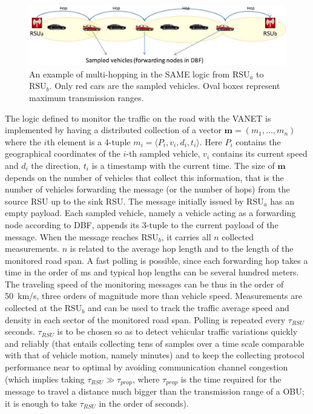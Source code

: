 \documentclass[conference]{IEEEtran}
\begin{document}
\begin{figure}[tbhp]
\begin{center}
\includegraphics[width=1.8\columnwidth]{fig/SAME_HOP.eps}
\caption{An example of multi-hopping in the SAME logic from $\text{RSU}_a$ to $\text{RSU}_b$. Only red cars are the sampled vehicles. Oval boxes represent maximum transmission ranges.}
\label{fig:same_hop}
\end{center}
\end{figure}



The logic defined to monitor the traffic on the road with the VANET is implemented by having a distributed collection of a vector $\mathbf m = (m_1,\ldots,m_n)$ where the $i$th element is a 4-tuple $m_i=\langle P_i, v_i, d_i, t_i \rangle$. Here $P_i$ contains the geographical coordinates of the $i$-th sampled vehicle, $v_i$ contains its current speed and $d_i$ the direction,  $t_i$ is a timestamp with the current time. The size of $\mathbf m$ depends on the number of vehicles that collect this information, that is the number of vehicles forwarding the message (or the number of hops) from the source RSU up to the sink RSU. The message initially issued by $\text{RSU}_a$ has an empty payload. Each sampled vehicle, namely a vehicle acting as a forwarding node according to DBF, appends its 3-tuple to the current payload of the message. When the message reaches $\text{RSU}_b$, it carries all $n$ collected measurements. $n$ is related to the average hop length and to the length of the monitored road span. A fast polling is possible, since each forwarding hop takes a time in the order of ms and typical hop lengths can be several hundred meters. The traveling speed of the monitoring messages can be thus in the order of 50~km/s, three orders of magnitude more than vehicle speed. Measurements are collected at the $\text{RSU}_b$ and can be used to track the traffic average speed and density in each sector of the monitored road span. Polling is repeated every $\tau_{RSU}$ seconds. $\tau_{RSU}$ is to be chosen so as to detect vehicular traffic variations quickly and reliably (that entails collecting tens of samples over a time scale comparable with that of vehicle motion, namely minutes) and to keep the collecting protocol performance near to optimal by avoiding communication channel congestion (which implies taking $\tau_{RSU} \gg \tau_{prop}$, where $\tau_{prop}$ is the time required for the message to travel a distance much bigger than the transmission range of a OBU; it is enough to take $\tau_{RSU}$ in the order of seconds).
\end{document}
